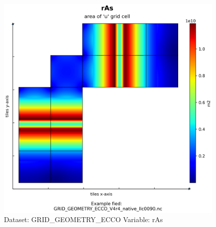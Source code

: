 \begin{figure}[H]
\centering
\includegraphics[width=\textwidth]{../images/plots/native_plots_coords/Geometry_Parameters_for_the_Lat-Lon-Cap_90_(llc90)_Native_Model_Grid_(Version_4_Release_4)/rAs.png}
\caption{Dataset: GRID\_GEOMETRY\_ECCO Variable: rAs}
\label{tab:table-GRID_GEOMETRY_ECCO_rAs-Plot}
\end{figure}
\pagebreak

